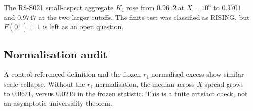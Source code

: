 The RS-S021 small-aspect aggregate \(K_1\) rose from
\(0.9612\) at \(X=10^6\) to \(0.9701\) and \(0.9747\)
at the two larger cutoffs. The finite test was classified
as RISING, but \(F(0^+)=1\) is left as an open question.

\subsection{Normalisation audit}
A control-referenced definition and the frozen
\(r_1\)-normalised excess show similar scale collapse.
Without the \(r_1\) normalisation, the median across-\(X\)
spread grows to \(0.0671\), versus \(0.0219\) in the
frozen statistic. This is a finite artefact check, not
an asymptotic universality theorem.
